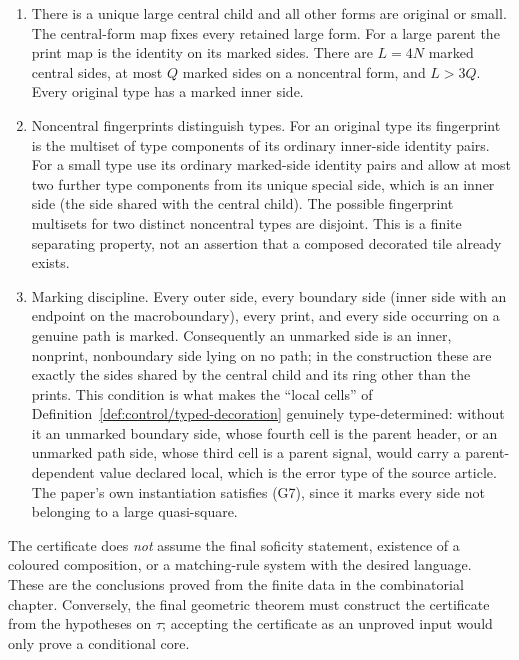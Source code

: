 \begin{definition}
\begin{enumerate}
fifth path and all five paths of unmarked parent sides are singleton
ports, disjoint from genuine paths.  This is a finite routing certificate.
\item[(G5)] There is a unique large central child and all other forms are
original or small.  The central-form map fixes every retained large form.
For a large parent the print map is the identity on its marked sides.
There are $L=4N$ marked central sides, at most $Q$ marked sides on a
noncentral form, and $L>3Q$.  Every original type has a marked inner side.
\item[(G6)] Noncentral fingerprints distinguish types.  For an original
type its fingerprint is the multiset of type components of its ordinary
inner-side identity pairs.  For a small type use its ordinary marked-side
identity pairs and allow at most two further type components from its
unique special side, which is an inner side (the side shared with the
central child).  The possible fingerprint multisets for two
distinct noncentral types are disjoint.  This is a finite separating
property, not an assertion that a composed decorated tile already exists.
\item[(G7)] Marking discipline.  Every outer side, every boundary side
(inner side with an endpoint on the macroboundary), every print, and every
side occurring on a genuine path is marked.  Consequently an unmarked side
is an inner, nonprint, nonboundary side lying on no path; in the
construction these are exactly the sides shared by the central child and
its ring other than the prints.  This condition is what makes the
``local cells'' of Definition~\ref{def:control/typed-decoration} genuinely
type-determined: without it an unmarked boundary side, whose fourth cell
is the parent header, or an unmarked path side, whose third cell is a
parent signal, would carry a parent-dependent value declared local, which
is the error type of the source article.  The paper's own instantiation
satisfies (G7), since it marks every side not belonging to a large
quasi-square.
\end{enumerate}
\end{definition}

The certificate does \emph{not} assume the final soficity statement,
existence of a coloured composition, or a matching-rule system with the
desired language.  These are the conclusions proved from the finite data
in the combinatorial chapter.  Conversely, the final geometric theorem
must construct the certificate from the hypotheses on $\tau$; accepting
the certificate as an unproved input would only prove a conditional core.

